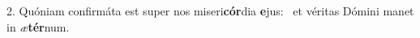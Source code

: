 2. Quóniam confirmáta est super nos miseri\textbf{cór}dia \textbf{e}jus: \ast\  et véritas Dómini manet in \textit{æ}\textbf{tér}num.\

